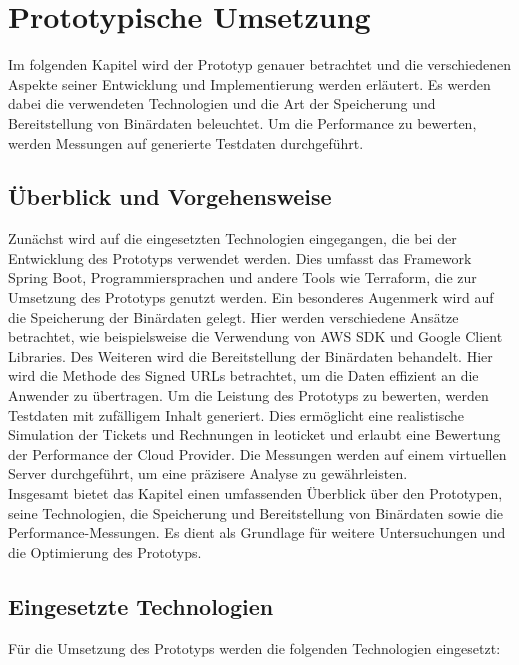 \chapter{Prototypische Umsetzung}     

Im folgenden Kapitel wird der Prototyp genauer betrachtet und die verschiedenen Aspekte seiner Entwicklung und Implementierung werden erläutert. Es werden dabei die verwendeten Technologien und die Art der Speicherung und Bereitstellung von Binärdaten beleuchtet. Um die Performance zu bewerten, werden Messungen auf generierte Testdaten durchgeführt.\\                               

\section{Überblick und Vorgehensweise}

Zunächst wird auf die eingesetzten Technologien eingegangen, die bei der Entwicklung des Prototyps verwendet werden. Dies umfasst das Framework Spring Boot, Programmiersprachen und andere Tools wie Terraform, die zur Umsetzung des Prototyps genutzt werden. Ein besonderes Augenmerk wird auf die Speicherung der Binärdaten gelegt. Hier werden verschiedene Ansätze betrachtet, wie beispielsweise die Verwendung von AWS SDK und Google Client Libraries. Des Weiteren wird die Bereitstellung der Binärdaten behandelt. Hier wird die Methode des Signed URLs betrachtet, um die Daten effizient an die Anwender zu übertragen. Um die Leistung des Prototyps zu bewerten, werden Testdaten mit zufälligem Inhalt generiert. Dies ermöglicht eine realistische Simulation der Tickets und Rechnungen in leoticket und erlaubt eine Bewertung der Performance der Cloud Provider. Die Messungen werden auf einem virtuellen Server durchgeführt, um eine präzisere Analyse zu gewährleisten.\\

Insgesamt bietet das Kapitel einen umfassenden Überblick über den Prototypen, seine Technologien, die Speicherung und Bereitstellung von Binärdaten sowie die Performance-Messungen. Es dient als Grundlage für weitere Untersuchungen und die Optimierung des Prototyps. 

\newpage

\section{Eingesetzte Technologien}

Für die Umsetzung des Prototyps werden die folgenden Technologien eingesetzt:

